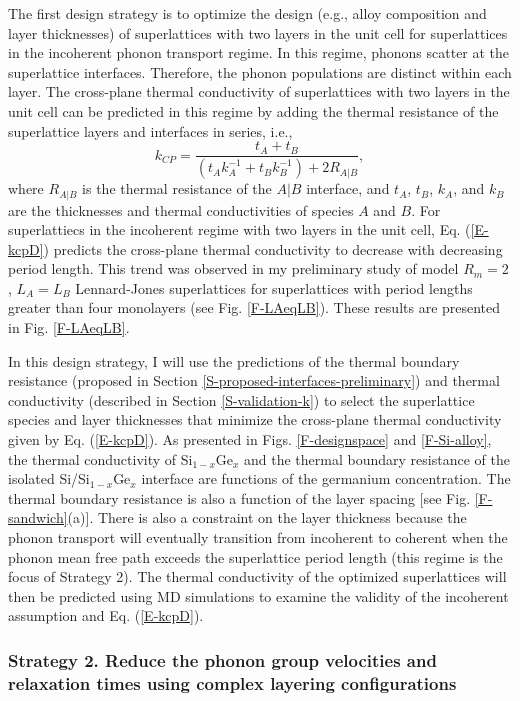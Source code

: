 \documentclass[letterpaper,12pt]{article}
\begin{document}
The first design strategy is to optimize the design (e.g., alloy
composition and layer thicknesses) of superlattices with two layers
in the unit cell for superlattices in the incoherent phonon
transport regime. In this regime, phonons scatter at the
superlattice interfaces. Therefore, the phonon populations are
distinct within each layer. The cross-plane thermal conductivity of
superlattices with two layers in the unit cell can be predicted in
this regime by adding the thermal resistance of the superlattice
layers and interfaces in series, i.e.,
\begin{equation}
k_{CP} = \frac{t_A + t_B}{(t_Ak_A^{-1} + t_Bk_B^{-1}) + 2R_{A|B}}
\label{E-kcpD},
\end{equation}
where $R_{A|B}$ is the thermal resistance of the $A|B$ interface,
and $t_A$, $t_B$, $k_A$, and $k_B$ are the thicknesses and thermal
conductivities of species $A$ and $B$. For superlattiecs in the
incoherent regime with two layers in the unit cell, Eq.
(\ref{E-kcpD}) predicts the cross-plane thermal conductivity to
decrease with decreasing period length. This trend was observed in
my preliminary study of model $R_m = 2$, $L_A = L_B$ Lennard-Jones
superlattices for superlattices with period lengths greater than
four monolayers (see Fig$.$ \ref{F-LAeqLB}). These results are
presented in Fig$.$ \ref{F-LAeqLB}.

In this design strategy, I will use the predictions of the thermal
boundary resistance (proposed in Section
\ref{S-proposed-interfaces-preliminary}) and thermal conductivity
(described in Section \ref{S-validation-k}) to select the
superlattice species and layer thicknesses that minimize the
cross-plane thermal conductivity given by Eq. (\ref{E-kcpD}). As
presented in Figs. \ref{F-designspace} and \ref{F-Si-alloy}, the
thermal conductivity of Si$_{1-x}$Ge$_x$ and the thermal boundary
resistance of the isolated Si/Si$_{1-x}$Ge$_x$ interface are
functions of the germanium concentration. The thermal boundary
resistance is also a function of the layer spacing [see Fig.
\ref{F-sandwich}(a)]. There is also a constraint on the layer
thickness because the phonon transport will eventually transition
from incoherent to coherent when the phonon mean free path exceeds
the superlattice period length (this regime is the focus of Strategy
2). The thermal conductivity of the optimized superlattices will
then be predicted using MD simulations to examine the validity of
the incoherent assumption and Eq. (\ref{E-kcpD}).

\subsubsection*{Strategy 2. Reduce the phonon group velocities and relaxation
times using complex layering configurations}
\end{document}
